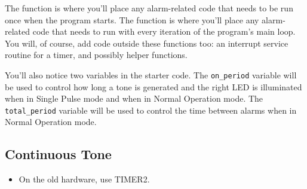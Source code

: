 The  function is where you'll place any alarm-related code that needs to be run once when the program starts.
The  function is where you'll place any alarm-related code that needs to run with every iteration of the program's main loop.
You will, of course, add code outside these functions too: an interrupt service routine for a timer, and possibly helper functions.

You'll also notice two variables in the starter code.
The \lstinline{on_period} variable will be used to control how long a tone is generated and the right LED is illuminated when in Single Pulse mode and when in Normal Operation mode.
The \lstinline{total_period} variable will be used to control the time between alarms when in Normal Operation mode.

\subsection{Continuous Tone}

\begin{description}
        \begin{itemize}
            \item On the old hardware, use TIMER2.
        \end{itemize}
\end{description}




